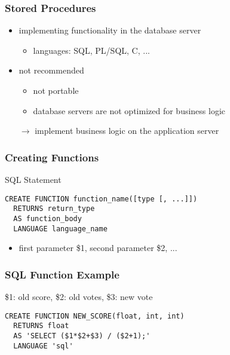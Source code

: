 \documentclass[dvipsnames]{beamer}
\theoremstyle{plain}
\begin{document}
\begin{frame}
  \frametitle{Stored Procedures}

  \begin{itemize}
    \item implementing functionality in the database server
    \begin{itemize}
      \item languages: SQL, PL/SQL, C, ...
    \end{itemize}

    \pause
    \bigskip
    \item \alert{not recommended}
    \begin{itemize}
      \item not portable
      \item database servers are not optimized for business logic
    \end{itemize}
    $\rightarrow$ implement business logic on the application server
  \end{itemize}
\end{frame}

\begin{frame}[fragile]
  \frametitle{Creating Functions}

  \begin{block}{SQL Statement}
    \begin{lstlisting}[language=ExtendedSQL]
CREATE FUNCTION function_name([type [, ...]])
  RETURNS return_type
  AS function_body
  LANGUAGE language_name
    \end{lstlisting}
  \end{block}

  \pause
  \begin{itemize}
    \item first parameter \$1, second parameter \$2, ...
  \end{itemize}
\end{frame}

\begin{frame}[fragile]
  \frametitle{SQL Function Example}

  \begin{example}
    \$1: old score, \$2: old votes, \$3: new vote
    \begin{lstlisting}[language=ExtendedSQL]
CREATE FUNCTION NEW_SCORE(float, int, int)
  RETURNS float
  AS 'SELECT ($1*$2+$3) / ($2+1);'
  LANGUAGE 'sql'
    \end{lstlisting}
  \end{example}
\end{frame}
\end{document}
